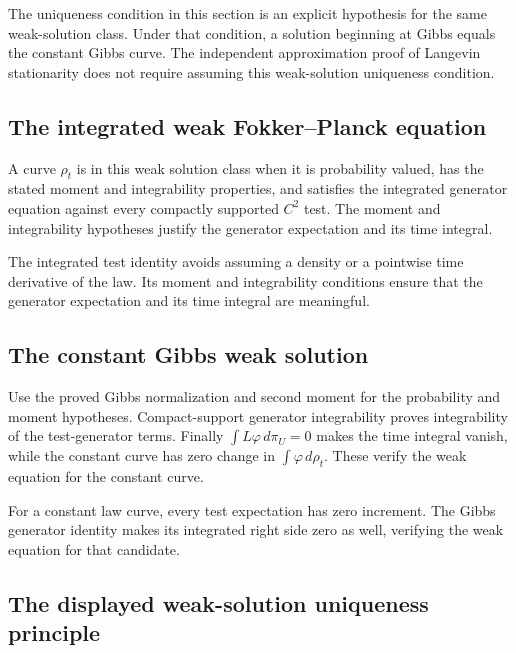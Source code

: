 \documentclass[11pt,a4paper]{report}
\begin{document}
The uniqueness condition in this section is an explicit hypothesis for the same weak-solution class. Under that condition, a solution beginning at Gibbs equals the constant Gibbs curve. The independent approximation proof of Langevin stationarity does not require assuming this weak-solution uniqueness condition.

\subsection{\texorpdfstring{The integrated weak Fokker–Planck equation}{The integrated weak Fokker–Planck equation}}
\label{report-step-UnadjustedLangevin-FokkerPlanck-lean-1}


A curve \(\rho_t\) is in this weak solution class when it is probability valued, has the stated moment and integrability properties, and satisfies the integrated generator equation against every compactly supported \(C^2\) test. The moment and integrability hypotheses justify the generator expectation and its time integral.



The integrated test identity avoids assuming a density or a pointwise time derivative of the law. Its moment and integrability conditions ensure that the generator expectation and its time integral are meaningful.

\subsection{\texorpdfstring{The constant Gibbs weak solution}{The constant Gibbs weak solution}}
\label{report-step-UnadjustedLangevin-FokkerPlanck-lean-2}


Use the proved Gibbs normalization and second moment for the probability and moment hypotheses. Compact-support generator integrability proves integrability of the test-generator terms. Finally \(\int L\varphi\,d\pi_U=0\) makes the time integral vanish, while the constant curve has zero change in \(\int\varphi\,d\rho_t\). These verify the weak equation for the constant curve.



For a constant law curve, every test expectation has zero increment. The Gibbs generator identity makes its integrated right side zero as well, verifying the weak equation for that candidate.

\subsection{\texorpdfstring{The displayed weak-solution uniqueness principle}{The displayed weak-solution uniqueness principle}}
\label{report-step-UnadjustedLangevin-FokkerPlanck-lean-3}
\end{document}

